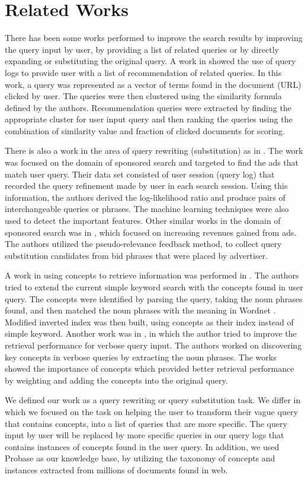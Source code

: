 \section{Related Works}
There has been some works performed to improve the search 
results by improving the query input by user, by providing 
a list of related queries or by directly expanding or 
substituting the original query. A work in 
\cite{Baeza-yates04queryrecommendation} showed the use of 
query logs to provide user with a list of recommendation of 
related queries. In this work, a query was represented as 
a vector of terms found in the document (URL) clicked by user. 
The queries were then clustered using the similarity formula 
defined by the authors. Recommendation queries were extracted 
by finding the appropriate cluster for user input query and 
then ranking the queries using the combination of similarity 
value and fraction of clicked documents for scoring.

There is also a work in the area of query rewriting (substitution) 
as in \cite{Jones06generatingquery}. The work was focused on the 
domain of sponsored search and targeted to find the ads that match 
user query. Their data set consisted of user session (query log) 
that recorded the query refinement made by user in each search 
session. Using this information, the authors derived the 
log-likelihood ratio and produce pairs of interchangeable queries or 
phrases. The machine learning techniques were also used to detect 
the important features. Other similar works in the domain of sponsored 
search was in \cite{Radlinski08optimizingrelevance}, which focused 
on increasing revenues gained from ads. The authors utilized the 
pseudo-relevance feedback method, to collect query substitution 
candidates from bid phrases that were placed by advertiser.

A work in using concepts to retrieve information was performed in 
\cite{semsearch-10}. The authors tried to extend the current simple 
keyword search with the concepts found in user query. The concepts 
were identified by parsing the query, taking the noun phrases found, 
and then matched the noun phrases with the meaning in Wordnet 
\cite{Miller95wordnet:a}. Modified inverted index was then built, 
using concepts as their index instead of simple keyword. Another work 
was in \cite{Bendersky:2008}, in which the author tried to improve 
the retrieval performance for verbose query input. The authors worked 
on discovering key concepts in verbose queries by extracting the noun 
phrases. The works showed the importance of concepts which provided 
better retrieval performance by weighting and adding the concepts 
into the original query.

We defined our work as a query rewriting or query substitution task. 
We differ in which we focused on the task on helping the user to 
transform their vague query that contains concepts, into a list of 
queries that are more specific. The query input by user will be 
replaced by more specific queries in our query logs that contains 
instances of concepts found in the user query. In addition, we used 
Probase \cite{website:Probase} as our knowledge base, by utilizing 
the taxonomy of concepts and instances extracted from millions of 
documents found in web.
